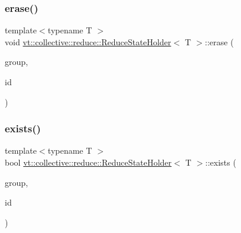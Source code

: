 \subsubsection{\texorpdfstring{erase()}{erase()}}
{\footnotesize\ttfamily template$<$typename T $>$ \\
void \hyperlink{structvt_1_1collective_1_1reduce_1_1_reduce_state_holder}{vt\+::collective\+::reduce\+::\+Reduce\+State\+Holder}$<$ T $>$\+::erase (\begin{DoxyParamCaption}\item[{\hyperlink{namespacevt_a27b5e4411c9b6140c49100e050e2f743}{Group\+Type}}]{group,  }\item[{\hyperlink{structvt_1_1collective_1_1reduce_1_1_reduce_state_holder_a783eeed6422fcc71cea89deca5ed8f08}{Reduce\+I\+D\+Type} const \&}]{id }\end{DoxyParamCaption})\hspace{0.3cm}{\ttfamily [static]}}

\mbox{\label{structvt_1_1collective_1_1reduce_1_1_reduce_state_holder_a64f9f3ddff05a936eeb6404a0286af02}} 
\subsubsection{\texorpdfstring{exists()}{exists()}}
{\footnotesize\ttfamily template$<$typename T $>$ \\
bool \hyperlink{structvt_1_1collective_1_1reduce_1_1_reduce_state_holder}{vt\+::collective\+::reduce\+::\+Reduce\+State\+Holder}$<$ T $>$\+::exists (\begin{DoxyParamCaption}\item[{\hyperlink{namespacevt_a27b5e4411c9b6140c49100e050e2f743}{Group\+Type}}]{group,  }\item[{\hyperlink{structvt_1_1collective_1_1reduce_1_1_reduce_state_holder_a783eeed6422fcc71cea89deca5ed8f08}{Reduce\+I\+D\+Type} const \&}]{id }\end{DoxyParamCaption})\hspace{0.3cm}{\ttfamily [static]}}

\mbox{\label{structvt_1_1collective_1_1reduce_1_1_reduce_state_holder_afc270038c752da5e6d82b4f09334b8b3}} 

